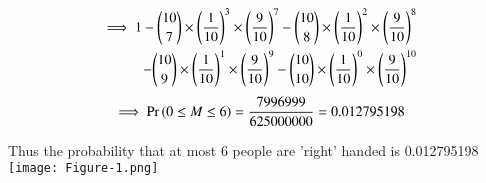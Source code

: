 \documentclass[journal,12pt,twocolumn]{IEEEtran}
\begin{document}
\begin{align}
\begin{split}
\implies 1 - {{10}\choose{7}} \times \brak{\frac{1}{10}}^{3} \times \brak{\frac{9}{10}}^{7} - {{10}\choose{8}} \times \brak{\frac{1}{10}}^{2} \times \brak{\frac{9}{10}}^{8}
\bigskip\\
-{{10}\choose{9}} \times \brak{\frac{1}{10}}^{1} \times \brak{\frac{9}{10}}^{9} - {{10}\choose{10}} \times \brak{\frac{1}{10}}^{0}\times
\brak{\frac{9}{10}}^{10}\label{0.0.6}
\end{split}
\end{align}
\begin{align}
\implies \Pr\left(0 \leq M \leq 6\right) = \frac{7996999}{625000000} = 0.012795198\notag
\end{align}

\bigskip
Thus the probability that at most 6 people are 'right' handed is 0.012795198 
\pagebreak
\texttt{[image: Figure-1.png]}
\end{document}
